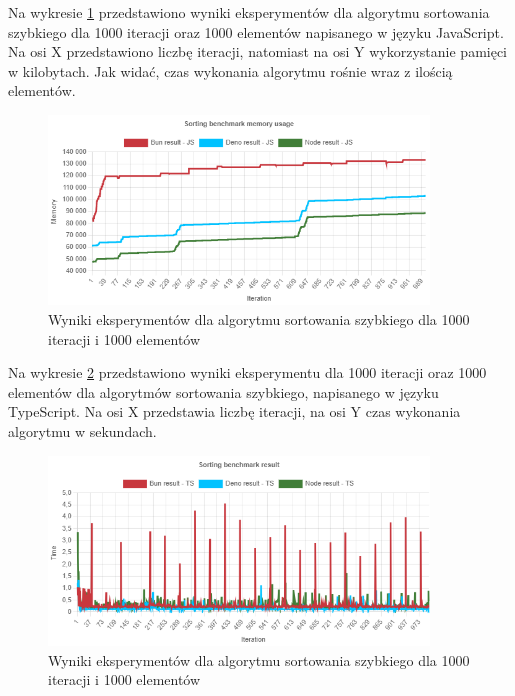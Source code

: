 Na wykresie \ref{fig:radix_sorting_e3_memory_js} przedstawiono wyniki eksperymentów dla algorytmu sortowania szybkiego dla 1000 iteracji oraz 1000 elementów napisanego w języku JavaScript. Na osi X przedstawiono liczbę iteracji, natomiast na osi Y wykorzystanie pamięci w kilobytach. Jak widać, czas wykonania algorytmu rośnie wraz z ilością elementów.
\begin{figure}[H]
  \centering
  \includegraphics[width=0.9\textwidth]{Figures/sorting/radix/e3_memory_js.png}
  \caption{Wyniki eksperymentów dla algorytmu sortowania szybkiego dla 1000 iteracji i 1000 elementów}
  \label{fig:radix_sorting_e3_memory_js}
\end{figure}

Na wykresie \ref{fig:radix_sorting_e3_ts} przedstawiono wyniki eksperymentu dla 1000 iteracji oraz 1000 elementów dla algorytmów sortowania szybkiego, napisanego w języku TypeScript. Na osi X przedstawia liczbę iteracji, na osi Y czas wykonania algorytmu w sekundach. 

\begin{figure}[H]
  \centering
  \includegraphics[width=0.9\textwidth]{Figures/sorting/radix/e3_ts.png}
  \caption{Wyniki eksperymentów dla algorytmu sortowania szybkiego dla 1000 iteracji i 1000 elementów}
  \label{fig:radix_sorting_e3_ts}
\end{figure}


